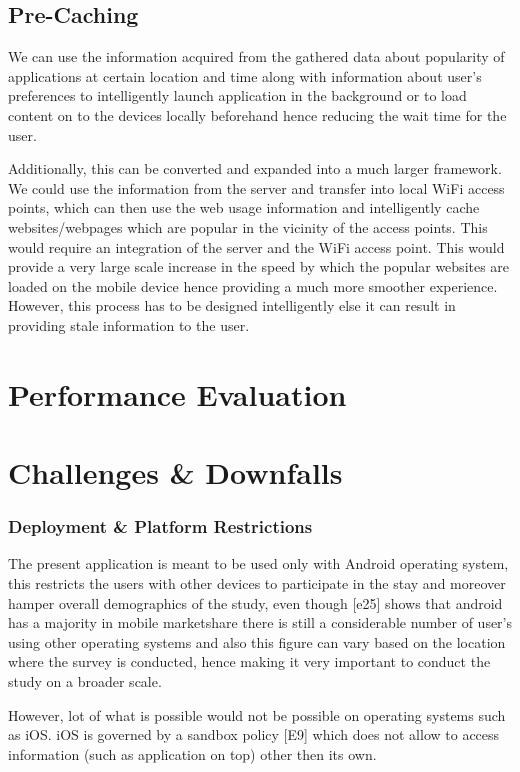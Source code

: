 \documentclass[12pt]{report}
\begin{document}
\section{Pre-Caching}
We can use the information acquired from the gathered data about popularity of applications at certain location and time along with information about user's preferences to intelligently launch application in the background or to load content on to the devices locally beforehand hence reducing the wait time for the user.

Additionally, this can be converted and expanded into a much larger framework. We could use the information from the server and transfer into local WiFi access points, which can then use the web usage information and intelligently cache websites/webpages which are popular in the vicinity of the access points. This would require an integration of the server and the WiFi access point. This would provide a very large scale increase in the speed by which the popular websites are loaded on the mobile device hence providing a much more smoother experience. However, this process has to be designed intelligently else it can result in providing stale information to the user.


\chapter{Performance Evaluation}
\chapter{Challenges \& Downfalls}
\label{challenges}
\subsection{Deployment \& Platform Restrictions}
The present application is meant to be used only with Android operating system, this restricts the users with other devices to participate in the stay and moreover hamper overall demographics of the study, even though [e25] shows that android has a majority in mobile marketshare there is still a considerable number of user's using other operating systems and also this figure can vary based on the location where the survey is conducted, hence making it very important to conduct the study on a broader scale.

However, lot of what is possible would not be possible on operating systems such as iOS. iOS is governed by a sandbox policy [E9] which does not allow to access information (such as application on top) other then its own.
\end{document}
